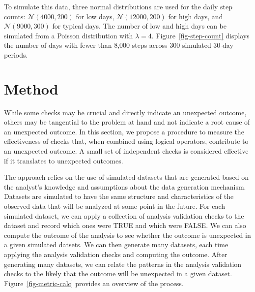 \documentclass[
  12pt,
]{interact}
\begin{document}
To simulate this data, three normal distributions are used for the daily
step counts: \(\mathcal{N}(4000, 200)\) for low days,
\(\mathcal{N}(12000, 200)\) for high days, and
\(\mathcal{N}(9000, 300)\) for typical days. The number of low and high
days can be simulated from a Poisson distribution with \(\lambda = 4\).
Figure~\ref{fig-step-count} displays the number of days with fewer than
8,000 steps across 300 simulated 30-day periods.

\section{Method}\label{sec-method}

While some checks may be crucial and directly indicate an unexpected
outcome, others may be tangential to the problem at hand and not
indicate a root cause of an unexpected outcome. In this section, we
propose a procedure to measure the effectiveness of checks that, when
combined using logical operators, contribute to an unexpected outcome. A
small set of independent checks is considered effective if it translates
to unexpected outcomes.

The approach relies on the use of simulated datasets that are generated
based on the analyst's knowledge and assumptions about the data
generation mechanism. Datasets are simulated to have the same structure
and characteristics of the observed data that will be analyzed at some
point in the future. For each simulated dataset, we can apply a
collection of analysis validation checks to the dataset and record which
ones were TRUE and which were FALSE. We can also compute the outcome of
the analysis to see whether the outcome is unexpected in a given
simulated datsets. We can then generate many datasets, each time
applying the analysis validation checks and computing the outcome. After
generating many datasets, we can relate the patterns in the analysis
validation checks to the likely that the outcome will be unexpected in a
given dataset. Figure~\ref{fig-metric-calc} provides an overview of the
process.
\end{document}
